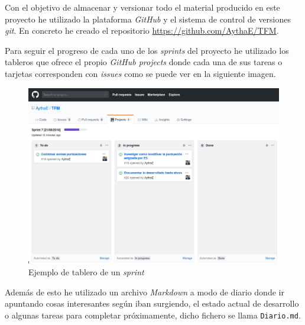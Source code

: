 Con el objetivo de almacenar y versionar todo el material producido en este proyecto he utilizado la plataforma \textit{GitHub} y el sistema de control de versiones \textit{git}. En concreto he creado el repositorio \url{https://github.com/AythaE/TFM}.

\newpage
Para seguir el progreso de cada uno de los \textit{sprints} del proyecto he utilizado los tableros que ofrece el propio \textit{GitHub projects} donde cada una de sus tareas o tarjetas corresponden con \textit{issues} como se puede ver en la siguiente imagen. 

\begin{figure}[h]
	
	\centering
	\includegraphics[width=\linewidth]{imagenes/ejemplo_tablero_sprint}
	\caption{Ejemplo de tablero de un \textit{sprint}}
	\label{fig:tableroSprint}
\end{figure}

Además de esto he utilizado un archivo \textit{Markdown} a modo de diario donde ir apuntando cosas interesantes según iban surgiendo, el estado actual de desarrollo o algunas tareas para completar próximamente, dicho fichero se llama \texttt{Diario.md}.
